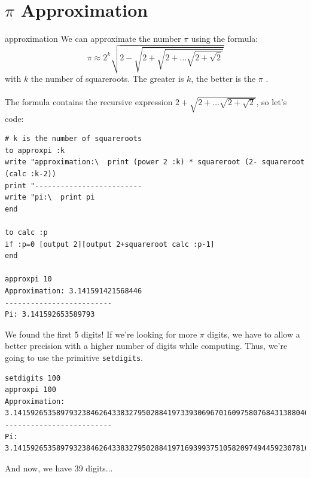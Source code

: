  \section{$\pi$ Approximation}
\label{approx-pi}approximation
\noindent We can approximate the number $\pi$ using the formula:
$$\pi\approx2^k\sqrt{2-\sqrt{2+\sqrt{2+\ldots\sqrt{2+\sqrt2}}}}$$ with $k$ the number of squareroots. The greater is $k$, the better is the $\pi$ .\\ \\
The formula contains the recursive expression $2+\sqrt{2+\ldots\sqrt{2+\sqrt2}}$, so let's code:
\begin{verbatim}
# k is the number of squareroots
to approxpi :k
write "approximation:\  print (power 2 :k) * squareroot (2- squareroot (calc :k-2))
print "-------------------------
write "pi:\  print pi
end

to calc :p
if :p=0 [output 2][output 2+squareroot calc :p-1]
end

approxpi 10
Approximation: 3.141591421568446 
------------------------- 
Pi: 3.141592653589793 
\end{verbatim}
We found the first 5 digits! If we're looking for more $\pi$ digits, we have to allow a better precision with a higher number of digits while computing. Thus, we're going to use the primitive \texttt{setdigits}.
\begin{verbatim}
setdigits 100
approxpi 100
Approximation: 3.1415926535897932384626433832795028841973393069670160975807684313880468...
------------------------- 
Pi: 3.141592653589793238462643383279502884197169399375105820974944592307816406....
\end{verbatim}
And now, we have 39 digits...